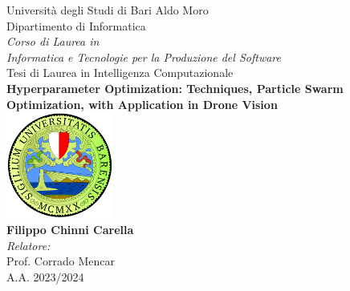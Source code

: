 \documentclass[12pt,twoside]{book}
\numberwithin{figure}{section}
\numberwithin{table}{section}
\numberwithin{equation}{section}
\begin{document}
\setcounter{secnumdepth}{3}
\setcounter{tocdepth}{3}


\frontmatter

\begin{titlepage}


\begin{center}
{\LARGE Università degli Studi di Bari Aldo Moro}\\[0.25cm]
{\Large Dipartimento di Informatica}\\[1cm]
{\large \emph{Corso di Laurea in\\[1cm]Informatica e Tecnologie per la Produzione del Software}}\\[1cm]
{\large Tesi di Laurea in Intelligenza Computazionale}\\[1.5cm]
\linespread{1.2}\LARGE {\bfseries Hyperparameter Optimization: Techniques, Particle Swarm Optimization, with Application in Drone Vision}\\[1.5cm]
\linespread{1}
\includegraphics[width=3.5cm]{images/Logo-Uniba.png}\\[1cm]
{\Large\bf Filippo Chinni Carella}\\[1cm]
\large \emph{Relatore:}\\
Prof. Corrado Mencar\\[1cm] 
\vspace{\fill}
A.A. 2023/2024
\end{center}

\end{titlepage}

\end{document}
